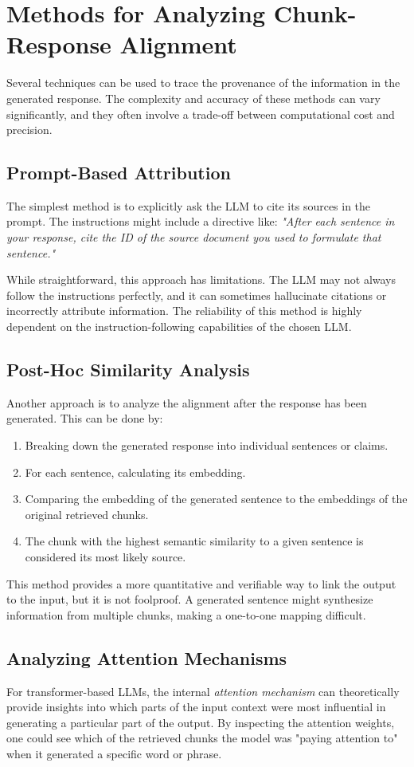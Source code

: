 \section{Methods for Analyzing Chunk-Response Alignment}
Several techniques can be used to trace the provenance of the information in the generated response. The complexity and accuracy of these methods can vary significantly, and they often involve a trade-off between computational cost and precision.

\subsection{Prompt-Based Attribution}
The simplest method is to explicitly ask the LLM to cite its sources in the prompt. The instructions might include a directive like: \textit{"After each sentence in your response, cite the ID of the source document you used to formulate that sentence."}

While straightforward, this approach has limitations. The LLM may not always follow the instructions perfectly, and it can sometimes hallucinate citations or incorrectly attribute information. The reliability of this method is highly dependent on the instruction-following capabilities of the chosen LLM.

\subsection{Post-Hoc Similarity Analysis}
Another approach is to analyze the alignment after the response has been generated. This can be done by:
\begin{enumerate}
    \item Breaking down the generated response into individual sentences or claims.
    \item For each sentence, calculating its embedding.
    \item Comparing the embedding of the generated sentence to the embeddings of the original retrieved chunks.
    \item The chunk with the highest semantic similarity to a given sentence is considered its most likely source.
\end{enumerate}
This method provides a more quantitative and verifiable way to link the output to the input, but it is not foolproof. A generated sentence might synthesize information from multiple chunks, making a one-to-one mapping difficult.

\subsection{Analyzing Attention Mechanisms}
For transformer-based LLMs, the internal \textit{attention mechanism} can theoretically provide insights into which parts of the input context were most influential in generating a particular part of the output. By inspecting the attention weights, one could see which of the retrieved chunks the model was "paying attention to" when it generated a specific word or phrase.


